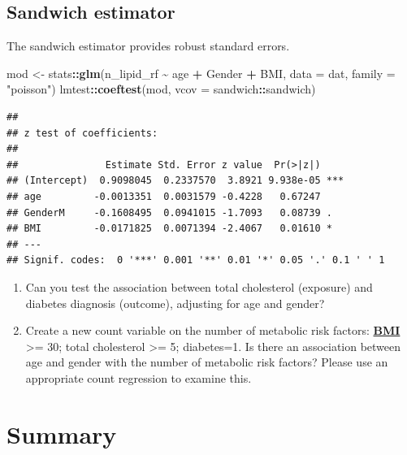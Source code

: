 \documentclass[
]{book}
\newenvironment{Shaded}{\begin{snugshade}}{\end{snugshade}}
\newcommand{\AttributeTok}[1]{\textcolor[rgb]{0.13,0.29,0.53}{#1}}
\newcommand{\FunctionTok}[1]{\textcolor[rgb]{0.13,0.29,0.53}{\textbf{#1}}}
\newcommand{\NormalTok}[1]{#1}
\newcommand{\OtherTok}[1]{\textcolor[rgb]{0.56,0.35,0.01}{#1}}
\newcommand{\SpecialCharTok}[1]{\textcolor[rgb]{0.81,0.36,0.00}{\textbf{#1}}}
\newcommand{\StringTok}[1]{\textcolor[rgb]{0.31,0.60,0.02}{#1}}
\providecommand{\tightlist}{%
  \setlength{\itemsep}{0pt}\setlength{\parskip}{0pt}}
\begin{document}
\subsection{Sandwich estimator}\label{sandwich-estimator}

The sandwich estimator provides robust standard errors.

\begin{Shaded}
\begin{Highlighting}[]
\NormalTok{mod }\OtherTok{\textless{}{-}}\NormalTok{ stats}\SpecialCharTok{::}\FunctionTok{glm}\NormalTok{(n\_lipid\_rf }\SpecialCharTok{\textasciitilde{}}\NormalTok{ age }\SpecialCharTok{+}\NormalTok{ Gender }\SpecialCharTok{+}\NormalTok{ BMI, }\AttributeTok{data =}\NormalTok{ dat, }\AttributeTok{family =} \StringTok{"poisson"}\NormalTok{)}
\NormalTok{lmtest}\SpecialCharTok{::}\FunctionTok{coeftest}\NormalTok{(mod, }\AttributeTok{vcov =}\NormalTok{ sandwich}\SpecialCharTok{::}\NormalTok{sandwich)}
\end{Highlighting}
\end{Shaded}

\begin{verbatim}
## 
## z test of coefficients:
## 
##               Estimate Std. Error z value  Pr(>|z|)    
## (Intercept)  0.9098045  0.2337570  3.8921 9.938e-05 ***
## age         -0.0013351  0.0031579 -0.4228   0.67247    
## GenderM     -0.1608495  0.0941015 -1.7093   0.08739 .  
## BMI         -0.0171825  0.0071394 -2.4067   0.01610 *  
## ---
## Signif. codes:  0 '***' 0.001 '**' 0.01 '*' 0.05 '.' 0.1 ' ' 1
\end{verbatim}

\begin{enumerate}
\def\labelenumi{\arabic{enumi}.}
\tightlist
\item
  Can you test the association between total cholesterol (exposure) and diabetes diagnosis (outcome), adjusting for age and gender?
\item
  Create a new count variable on the number of metabolic risk factors: \textbf{\hyperref[acronyms_BMI]{BMI}} \textgreater= 30; total cholesterol \textgreater= 5; diabetes=1. Is there an association between age and gender with the number of metabolic risk factors? Please use an appropriate count regression to examine this.
\end{enumerate}

\section{Summary}\label{summary}
\end{document}
